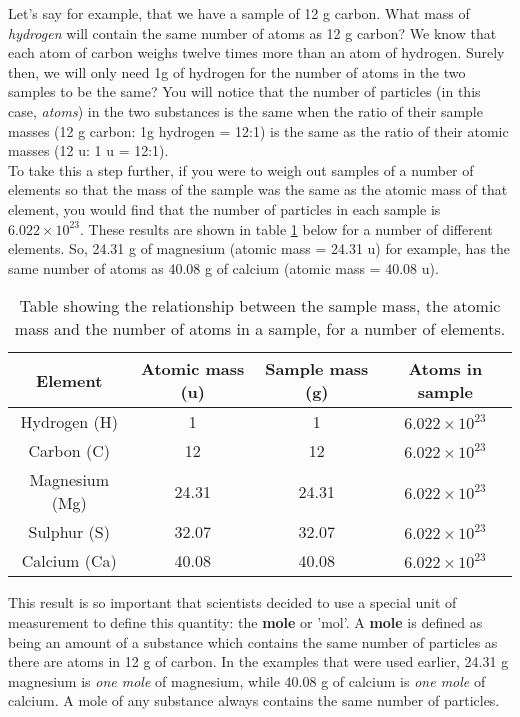 Let's say for example, that we have a sample of 12 g carbon. What mass of \textit{hydrogen} will contain the same number of atoms as 12 g carbon? We know that each atom of carbon weighs twelve times more than an atom of hydrogen. Surely then, we will only need 1g of hydrogen for the number of atoms in the two samples to be the same? You will notice that the number of particles (in this case, \textit{atoms}) in the two substances is the same when the ratio of their sample masses (12 g carbon: 1g hydrogen = 12:1) is the same as the ratio of their atomic masses (12 u: 1 u = 12:1).\\

To take this a step further, if you were to weigh out samples of a number of elements so that the mass of the sample was the same as the atomic mass of that element, you would find that the number of particles in each sample is $6.022 \times 10^{23}$. These results are shown in table \ref{tab:quant:atoms} below for a number of different elements. So, 24.31 g of magnesium (atomic mass = 24.31 u) for example, has the same number of atoms as 40.08 g of calcium (atomic mass = 40.08 u). \\

\begin{table}[H]
\begin{center}
\caption{Table showing the relationship between the sample mass, the atomic mass and the number of atoms in a sample, for a number of elements.}
\label{tab:quant:atoms}
\begin{tabular}{|c|c|c|c|}\hline
\textbf{Element} & \textbf{Atomic mass (u)} & \textbf{Sample mass (g)} & \textbf{Atoms in sample}\\\hline
Hydrogen (H) & 1 & 1 & $6.022 \times 10^{23}$\\\hline
Carbon (C) & 12 & 12 & $6.022 \times 10^{23}$\\\hline
Magnesium (Mg) & 24.31 & 24.31 & $6.022 \times 10^{23}$\\\hline
Sulphur (S) & 32.07 & 32.07 & $6.022 \times 10^{23}$\\\hline
Calcium (Ca) & 40.08 & 40.08 & $6.022 \times 10^{23}$\\\hline
\end{tabular}
\end{center}
\end{table}

This result is so important that scientists decided to use a special unit of measurement to define this quantity: the \textbf{mole} or 'mol'. A \textbf{mole} is defined as being an amount of a substance which contains the same number of particles as there are atoms in 12 g of carbon. In the examples that were used earlier, 24.31 g magnesium is \textit{one mole} of magnesium, while 40.08 g of calcium is \textit{one mole} of calcium. A mole of any substance always contains the same number of particles.

